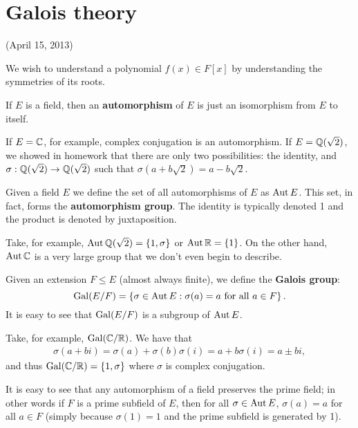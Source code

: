 \documentclass{../mathnotes}
\begin{document}
\section{Galois theory}

(April 15, 2013)

We wish to understand a polynomial $f(x)\in F[x]$ by understanding the symmetries of its roots.

\begin{defn}
    If $E$ is a field, then an \textbf{automorphism} of $E$ is just an isomorphism from $E$ to itself.
\end{defn}

If $E=\mathbb{C}$, for example, complex conjugation is an automorphism. If $E=\mathbb{Q}(\sqrt{2})$, we showed in homework
that there are only two possibilities: the identity, and $\sigma:\mathbb{Q}(\sqrt{2})\to\mathbb{Q}(\sqrt{2})$ such that $\sigma(a+b\sqrt{2})=a-b\sqrt{2}$.

\begin{defn}
    Given a field $E$ we define the set of all automorphisms of $E$ as $\operatorname{Aut} E$. This set, in fact, forms the \textbf{automorphism group}.
    The identity is typically denoted 1 and the product is denoted by juxtaposition.
\end{defn}

Take, for example, $\operatorname{Aut} \mathbb{Q}(\sqrt{2})=\left\{ 1,\sigma \right\}$ or $\operatorname{Aut}\mathbb{R}=\left\{ 1 \right\}$. On the other hand,
$\operatorname{Aut}\mathbb{C}$ is a very large group that we don't even begin to describe.

\begin{defn}
    Given an extension $F\leq E$ (almost always finite), we define the \textbf{Galois group}:
    \[\operatorname{Gal}(E/F)=\left\{ \sigma\in\operatorname{Aut} E:\sigma(a)=a \text{ for all } a\in F \right\}.\]
    It is easy to see that $\operatorname{Gal}(E/F)$ is a subgroup of $\operatorname{Aut} E$.
\end{defn}

\begin{exmp}
    Take, for example, $\operatorname{Gal}(\mathbb{C}/\mathbb{R})$. We have that 
    \begin{align*}
        \sigma(a+bi)=\sigma(a)+\sigma(b)\sigma(i)=a+b\sigma(i)=a\pm bi,
    \end{align*}
    and thus $\operatorname{Gal}(\mathbb{C}/\mathbb{R})=\left\{ 1,\sigma \right\}$ where $\sigma$ is complex conjugation.

    It is easy to see that any automorphism of a field preserves the prime field; in other words if $F$ is a prime
    subfield of $E$, then for all $\sigma\in\operatorname{Aut} E$, $\sigma(a)=a$ for all $a\in F$ (simply because $\sigma(1)=1$ and 
    the prime subfield is generated by 1). 
\end{exmp}
\end{document}
